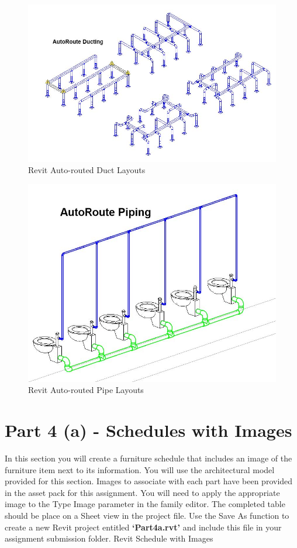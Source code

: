 \begin{figure}[h]
	\centering
	\includegraphics[width=0.9\linewidth]{img/AutoRouteDuct.jpg}
	\caption{Revit Auto-routed Duct Layouts}
	\label{fig:AutorouteDuct}
\end{figure}


\begin{figure}[h]
	\centering
	\includegraphics[width=0.7\linewidth]{img/AutoRoutePipe.jpg}
	\caption{Revit Auto-routed Pipe Layouts}
	\label{fig:AutoroutePipe}
\end{figure}


\newpage

\section*{Part 4 (a) - Schedules with Images}
In this section you will create a furniture schedule that includes an image of the furniture item next to its information. You will use the architectural model provided for this section. Images to associate with each part have been provided in the asset pack for this assignment. You will need to apply the appropriate image to the Type Image parameter in the family editor. The completed table should be place on a Sheet view in the project file. Use the Save As function to create a new Revit project entitled \textbf{‘Part4a.rvt’} and include this file in your assignment submission folder.
Revit Schedule with Images

